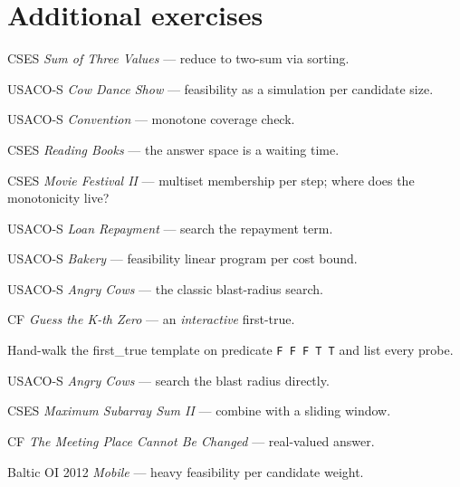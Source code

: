 \section{Additional exercises}
\begin{exercise}[easy]
CSES \emph{Sum of Three Values} --- reduce to two-sum via sorting.
\end{exercise}
\begin{exercise}[easy]
USACO-S \emph{Cow Dance Show} --- feasibility as a simulation per
candidate size.
\end{exercise}
\begin{exercise}[easy]
USACO-S \emph{Convention} --- monotone coverage check.
\end{exercise}
\begin{exercise}[medium]
CSES \emph{Reading Books} --- the answer space is a waiting time.
\end{exercise}
\begin{exercise}[medium]
CSES \emph{Movie Festival II} --- multiset membership per step; where
does the monotonicity live?
\end{exercise}
\begin{exercise}[medium]
USACO-S \emph{Loan Repayment} --- search the repayment term.
\end{exercise}
\begin{exercise}[medium]
USACO-S \emph{Bakery} --- feasibility linear program per cost bound.
\end{exercise}
\begin{exercise}[medium]
USACO-S \emph{Angry Cows} --- the classic blast-radius search.
\end{exercise}
\begin{exercise}[medium]
CF \emph{Guess the K-th Zero} --- an \emph{interactive} first-true.
\end{exercise}
\begin{exercise}[easy] Hand-walk the first\_true template on predicate \texttt{F F F T T} and list every probe. \end{exercise}
\begin{exercise}[medium] USACO-S \emph{Angry Cows} --- search the blast radius directly. \end{exercise}
\begin{exercise}[hard]
CSES \emph{Maximum Subarray Sum II} --- combine with a sliding window.
\end{exercise}
\begin{exercise}[hard]
CF \emph{The Meeting Place Cannot Be Changed} --- real-valued answer.
\end{exercise}
\begin{exercise}[hard]
Baltic OI 2012 \emph{Mobile} --- heavy feasibility per candidate weight.
\end{exercise}

